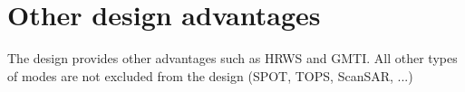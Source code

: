 \section{Other design advantages}
The design provides other advantages such as HRWS and GMTI. All other types of modes are not excluded from the design (SPOT, TOPS, ScanSAR, ...)